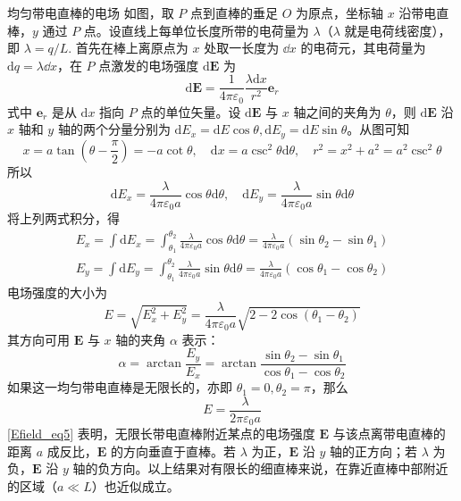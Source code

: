 \begin{example}{均匀带电直棒的电场}
如图，取 $P$ 点到直棒的垂足 $O$ 为原点，坐标轴 $x$ 沿带电直棒，$y$ 通过 $P$ 点。设直线上每单位长度所带的电荷量为 $\lambda$（$\lambda$ 就是电荷线密度），即 $\lambda=q/L$. 首先在棒上离原点为 $x$ 处取一长度为 $\dd{x}$ 的电荷元，其电荷量为 $\mathrm dq=\lambda\dd{x}$，在 $P$ 点激发的电场强度 $\mathrm d\mathbf E$ 为
\begin{equation}
\mathrm{d} \mathbf{E}=\frac{1}{4 \pi \varepsilon_{0}} \frac{\lambda \mathrm{d} x}{r^{2}} \mathbf e_r
\end{equation}
式中 $\mathbf e_r$ 是从 $\mathrm dx$ 指向 $P$ 点的单位矢量。设 $\mathrm{d} \mathbf{E}$ 与 $x$ 轴之间的夹角为 $\theta$，则 $\mathrm{d} \mathbf{E}$ 沿 $x$ 轴和 $y$ 轴的两个分量分别为 $\mathrm{d} E_{x}=\mathrm{d} E \cos \theta, \mathrm{d} E_{y}=\mathrm{d} E \sin \theta$。从图可知
\begin{equation}
x=a \tan \left(\theta-\frac{\pi}{2}\right)=-a \cot \theta, \quad \mathrm{d} x=a \csc ^{2} \theta \mathrm{d} \theta, \quad r^{2}=x^{2}+a^{2}=a^{2} \csc ^{2} \theta
\end{equation}
所以
\begin{equation}
\mathrm{d} E_{x}=\frac{\lambda}{4 \pi \varepsilon_{0} a} \cos \theta \mathrm{d} \theta, \quad \mathrm{d} E_{y}=\frac{\lambda}{4 \pi \varepsilon_{0} a} \sin \theta \mathrm{d} \theta
\end{equation}
将上列两式积分，得
\begin{equation}
\begin{aligned}E_{x}=\int \mathrm{d} E_{x}=\int_{\theta_{1}}^{\theta_{2}} \frac{\lambda}{4 \pi \varepsilon_{0} a} \cos \theta \mathrm{d} \theta=\frac{\lambda}{4 \pi \varepsilon_{0} a}\left(\sin \theta_{2}-\sin \theta_{1}\right) \\ E_{y}=\int \mathrm{d} E_{y}=\int_{\theta_{1}}^{\theta_{2}} \frac{\lambda}{4 \pi \varepsilon_{0} a} \sin \theta \mathrm{d} \theta=\frac{\lambda}{4 \pi \varepsilon_{0} a}\left(\cos \theta_{1}-\cos \theta_{2}\right)\end{aligned}
\end{equation}
电场强度的大小为
\begin{equation}
E=\sqrt{E_{x}^{2}+E_{y}^{2}}=\frac{\lambda}{4 \pi \varepsilon_{0} a} \sqrt{2-2 \cos \left(\theta_{1}-\theta_{2}\right)}
\end{equation}
其方向可用 $\mathbf E$ 与 $x$ 轴的夹角 $\alpha$ 表示：
\begin{equation}
\alpha=\arctan \frac{E_{y}}{E_{x}}=\arctan \frac{\sin \theta_{2}-\sin \theta_{1}}{\cos \theta_{1}-\cos \theta_{2}}
\end{equation}
如果这一均匀带电直棒是无限长的，亦即 $\theta_{1}=0, \theta_{2}=\pi$，那么
\begin{equation} \label{Efield_eq5}
E=\frac{\lambda}{2 \pi \varepsilon_{0} a}
\end{equation}
\autoref{Efield_eq5} 表明，无限长带电直棒附近某点的电场强度 $\mathbf E$ 与该点离带电直棒的距离 $a$ 成反比，$\mathbf  E$ 的方向垂直于直棒。若 $\lambda$ 为正，$\mathbf E$ 沿 $y$ 轴的正方向；若 $\lambda$ 为负，$\mathbf E$ 沿 $y$ 轴的负方向。以上结果对有限长的细直棒来说，在靠近直棒中部附近的区域（$a\ll L$）也近似成立。
\end{example}


